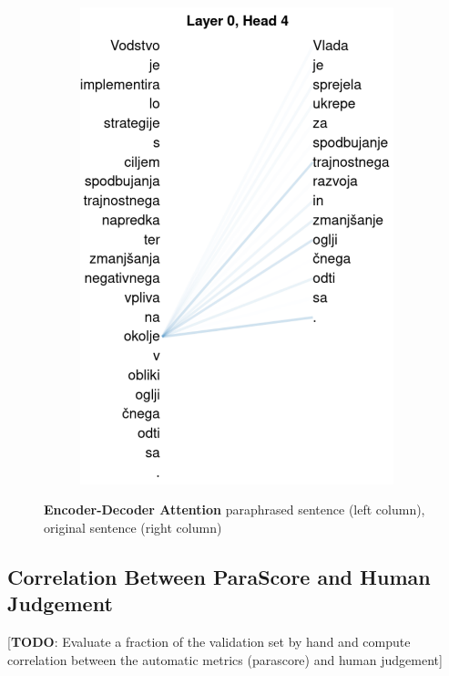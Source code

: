 \documentclass[fleqn,moreauthors,10pt]{ds_report}
\begin{document}
\begin{figure}[ht]
\begin{subfigure}{0.45\linewidth}
        \includegraphics[width=\textwidth]{report/fig/t5-sen1-conn2.pdf}
        \label{fig:t5-sen1-conn2}
    \end{subfigure}
    \caption{\textbf{Encoder-Decoder Attention} paraphrased sentence (left column), original sentence (right column)}
    \label{fig:t5-sen1-cross-attention}
\end{figure}



\subsection{Correlation Between ParaScore and Human Judgement}

[\textbf{TODO}: Evaluate a fraction of the validation set by hand and compute correlation between the automatic metrics (parascore) and human judgement]
\end{document}
